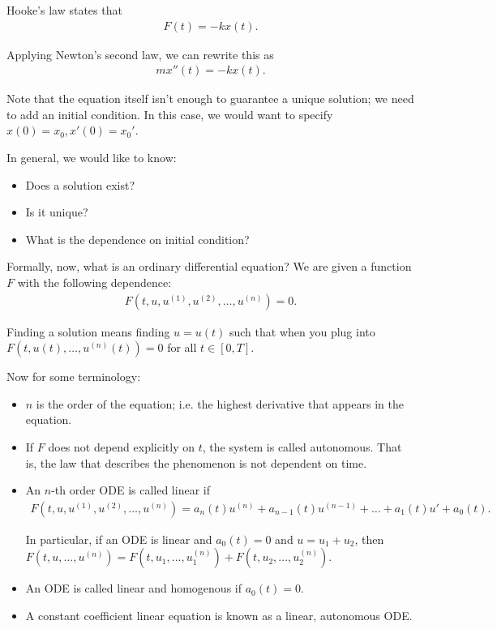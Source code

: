\documentclass{article}
\begin{document}
Hooke's law states that
\begin{align*}
  F(t) = -k x(t).
\end{align*}

Applying Newton's second law, we can rewrite this as
\begin{align*}
  m x''(t) = - k x(t).
\end{align*}

Note that the equation itself isn't enough to guarantee a unique solution; we need to add an initial condition.  In this case, we would want to specify $x(0) = x_0, x'(0) = x_0'$.

In general, we would like to know:

\begin{itemize}
  \item Does a solution exist?
  \item Is it unique?
  \item What is the dependence on initial condition?
\end{itemize}

Formally, now, what is an ordinary differential equation?  We are given a function $F$ with the following dependence:
\begin{align*}
  F(t, u, u^{(1)}, u^{(2)}, \dots, u^{(n)}) = 0.
\end{align*}

Finding a solution means finding $u = u(t)$ such that when you plug into $F(t, u(t), \dots, u^{(n)}(t)) = 0$ for all $t \in [0, T]$.

Now for some terminology:

\begin{itemize}
  \item $n$ is the order of the equation; i.e. the highest derivative that appears in the equation.
  \item If $F$ does not depend explicitly on $t$, the system is called autonomous.  That is, the law that describes the phenomenon is not dependent on time.
  \item An $n$-th order ODE is called linear if 
    \begin{align*}
      F(t, u, u^{(1)}, u^{(2)}, \dots, u^{(n)}) = a_n(t) u^{(n)} + a_{n-1}(t) u^{(n-1)} + \dots + a_1(t) u' + a_0(t).
    \end{align*}

    In particular, if an ODE is linear and $a_0(t) = 0$ and $u = u_1 + u_2$, then $F(t, u, \dots, u^{(n)}) = F(t, u_1, \dots, u_1^{(n)}) + F(t, u_2, \dots, u_2^{(n)})$.
  \item An ODE is called linear and homogenous if $a_0(t) = 0$. 
  \item A constant coefficient linear equation is known as a linear, autonomous ODE. 
\end{itemize}
\end{document}
